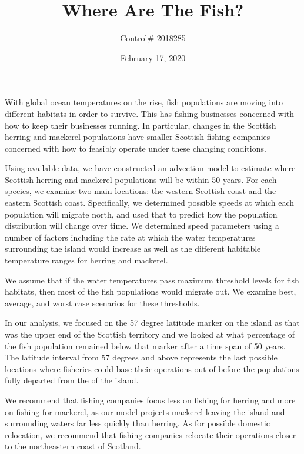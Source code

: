 \documentclass[12pt]{article}
\title{Where Are The Fish?}
\author{Control\# 2018285}
\date{February 17, 2020}
\begin{document}
\thispagestyle{firststyle}

With global ocean temperatures on the rise, fish populations are moving into different habitats in order to survive. This has fishing businesses concerned with how to keep their businesses running. In particular, changes in the Scottish herring and mackerel populations have smaller Scottish fishing companies concerned with how to feasibly operate under these changing conditions.

Using available data, we have constructed an advection model to estimate where Scottish herring and mackerel populations will be within 50 years. For each species, we examine two main locations: the western Scottish coast and the eastern Scottish coast. Specifically, we determined possible speeds at which each population will migrate north, and used that to predict how the population distribution will change over time. We determined speed parameters using a number of factors including the rate at which the water temperatures surrounding the island would increase as well as the different habitable temperature ranges for herring and mackerel. 

We assume that if the water temperatures pass maximum threshold levels for fish habitats, then most of the fish populations would migrate out. We examine best, average, and worst case scenarios for these thresholds.

In our analysis, we focused on the 57 degree latitude marker on the island as that was the upper end of the Scottish territory and we looked at what percentage of the fish population remained below that marker after a time span of 50 years. The latitude interval from 57 degrees and above represents the last possible locations where fisheries could base their operations out of before the populations fully departed from the of the island. 

We recommend that fishing companies focus less on fishing for herring and more on fishing for mackerel, as our model projects mackerel leaving the island and surrounding waters far less quickly than herring. As for possible domestic relocation, we recommend that fishing companies relocate their operations closer to the northeastern coast of Scotland.


\newpage 

\setcounter{page}{1}
\maketitle
\end{document}

